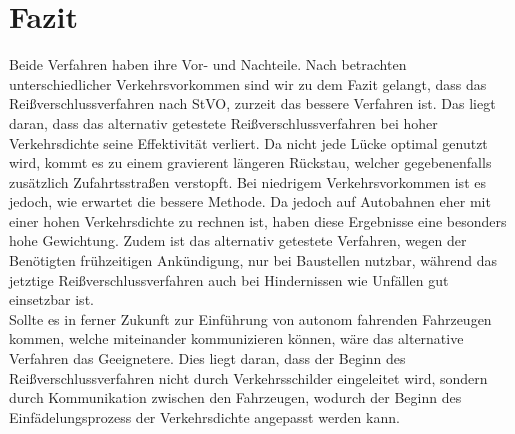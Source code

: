 \chapter{Fazit}
Beide Verfahren haben ihre Vor- und Nachteile. Nach betrachten unterschiedlicher Verkehrsvorkommen sind wir zu dem Fazit gelangt, dass das Reißverschlussverfahren nach StVO, zurzeit das bessere Verfahren ist.
Das liegt daran, dass das alternativ getestete Reißverschlussverfahren bei hoher Verkehrsdichte seine Effektivität verliert. Da nicht jede Lücke optimal genutzt wird, kommt es zu einem gravierent längeren Rückstau, welcher gegebenenfalls zusätzlich Zufahrtsstraßen verstopft. Bei niedrigem Verkehrsvorkommen ist es jedoch, wie erwartet die bessere Methode. Da jedoch auf Autobahnen eher mit einer hohen Verkehrsdichte zu rechnen ist, haben diese Ergebnisse eine besonders hohe Gewichtung. Zudem ist das alternativ getestete Verfahren, wegen der Benötigten frühzeitigen Ankündigung, nur bei Baustellen nutzbar, während das jetztige Reißverschlussverfahren auch bei Hindernissen wie Unfällen gut einsetzbar ist.\\
Sollte es in ferner Zukunft zur Einführung von autonom fahrenden Fahrzeugen kommen, welche miteinander kommunizieren können, wäre das alternative Verfahren das Geeignetere. Dies liegt daran, dass der Beginn des Reißverschlussverfahren nicht durch Verkehrsschilder eingeleitet wird, sondern durch Kommunikation zwischen den Fahrzeugen, wodurch der Beginn des Einfädelungsprozess der Verkehrsdichte angepasst werden kann.